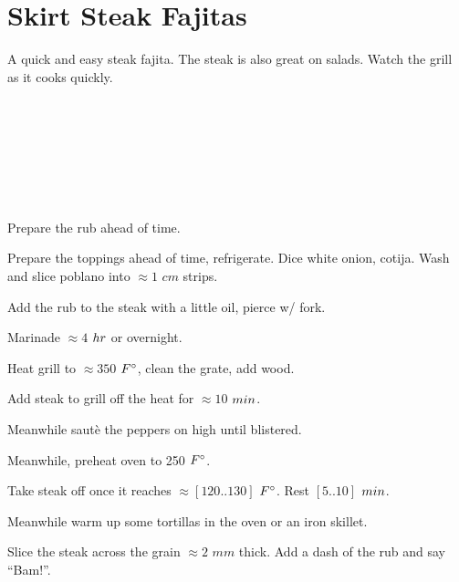 \section[Steak Fajitas]{Skirt Steak Fajitas}


\begin{recipestats}[
	servings=4,
	preptime=30~\minute,
	bakingtime=15~\minute,
	inactivetime=4~\hour,
	source=Mike \& Jane,
]
\end{recipestats}


\begin{recipeabstract}
	A quick and easy steak fajita.
	The steak is also great on salads.
	Watch the grill as it cooks quickly.
\end{recipeabstract}


\begin{ingredientcolumns}[1]
	\begin{ingredientblock}
		\\
		\\
		\\
		\\
		\\
		\\
	\end{ingredientblock}
\end{ingredientcolumns}


\begin{preparation}
\item Prepare the rub ahead of time.
\item Prepare the toppings ahead of time, refrigerate.
	Dice white onion, cotija.
	Wash and slice poblano into $\approx 1$ $cm$ strips.
\item Add the rub to the steak with a little oil, pierce w/ fork.
\item Marinade $\approx 4$ $\hour$ or overnight.
\item Heat grill to $\approx 350$ $\Fahrenheit$, clean the grate, add wood.
\item Add steak to grill off the heat for $\approx 10$ $\minute$.
\item Meanwhile saut\`{e} the peppers on high until blistered.
\item Meanwhile, preheat oven to 250 $\Fahrenheit$.
\item Take steak off once it reaches $\approx [120 .. 130]$ $\Fahrenheit$.
	Rest $[5..10]$ $\minute$.
\item Meanwhile warm up some tortillas in the oven or an iron skillet.
\item Slice the steak across the grain $\approx 2$ $mm$ thick.
	Add a dash of the rub and say ``Bam!''.
\end{preparation}


\recipeend%
